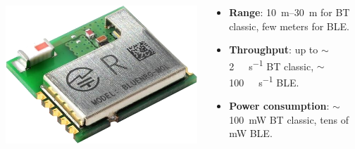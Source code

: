 \documentclass[11pt,xcolor=table,aspectratio=169]{beamer}
\begin{document}
\begin{frame}
{\begin{columns}
\begin{column}{.3\textwidth}
\begin{adjustbox}{max height=.3\textheight}
						\includegraphics[width=\textwidth]{media/BT.png}
					\end{adjustbox}
				\end{column}
				\begin{column}{.7\textwidth}
					\begin{itemize}
						\item \textbf{Range}: \SIrange{10}{30}{\meter} for BT classic, few meters for BLE.
						\item \textbf{Throughput}: up to $\sim$\SI{2}{\mega\bit\per\second} BT classic, $\sim$\SI{100}{\kilo\bit\per\second} BLE.
						\item \textbf{Power consumption}: $\sim$\SI{100}{\milli\watt} BT classic, tens of \si{\milli\watt} BLE.
					\end{itemize}
				\end{column}
			\end{columns}
		}
\end{frame}
\end{document}
